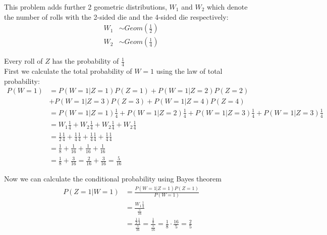 
This problem adds further 2 geometric distributions, $W_1$ and $W_2$ which denote the number of rolls with the 2-sided die and the 4-sided die respectively:
\begin{align*}
	W_1 & \sim Geom\left(\frac{1}{2}\right) \\
	W_2 & \sim Geom\left(\frac{1}{4}\right)
\end{align*}

Every roll of $Z$ has the probability of $\frac{1}{4}$\\

First we calculate the total probability of $W=1$ using the law of total probability:
\begin{align*}
	P(W=1) & = P(W=1|Z=1)P(Z=1) + P(W=1|Z=2)P(Z=2)                                                               \\
	       & + P(W=1|Z=3)P(Z=3) + P(W=1|Z=4)P(Z=4)                                                               \\
	       & = P(W=1|Z=1)\frac{1}{4} + P(W=1|Z=2)\frac{1}{4} + P(W=1|Z=3)\frac{1}{4} + P(W=1|Z=3)\frac{1}{4}     \\
	       & = W_1\frac{1}{4} + W_2\frac{1}{4} + W_2\frac{1}{4} + W_2\frac{1}{4}                                 \\
	       & = \frac{1}{2}\frac{1}{4} + \frac{1}{4}\frac{1}{4} + \frac{1}{4}\frac{1}{4} + \frac{1}{4}\frac{1}{4} \\
	       & = \frac{1}{8} + \frac{1}{16} + \frac{1}{16} + \frac{1}{16}                                          \\
	       & = \frac{1}{8} + \frac{3}{16} = \frac{2}{16} + \frac{3}{16} = \frac{5}{16}
\end{align*}

Now we can calculate the conditional probability using Bayes theorem
\begin{align*}
	P(Z=1|W=1) & = \frac{P(W=1|Z=1)P(Z=1)}{P(W=1)}                                                                                             \\
	           & = \frac{W_1\frac{1}{4}}{\frac{5}{16}}                                                                                         \\
	           & = \frac{\frac{1}{2}\frac{1}{4}}{\frac{5}{16}} = \frac{\frac{1}{8}}{\frac{5}{16}} = \frac{1}{8}\cdot\frac{16}{5} = \frac{2}{5}
\end{align*}


